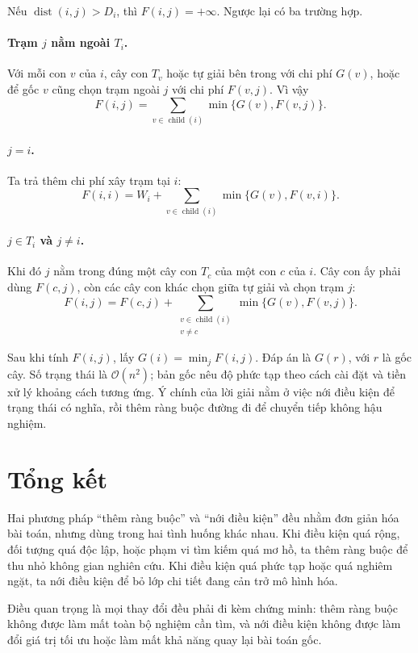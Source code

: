 \documentclass[11pt]{article}
\newcommand{\Oh}{\mathcal{O}}
\begin{document}
Nếu \(\operatorname{dist}(i,j)>D_i\), thì \(F(i,j)=+\infty\). Ngược lại có ba
trường hợp.

\paragraph{Trạm \(j\) nằm ngoài \(T_i\).}
Với mỗi con \(v\) của \(i\), cây con \(T_v\) hoặc tự giải bên trong với chi
phí \(G(v)\), hoặc để gốc \(v\) cũng chọn trạm ngoài \(j\) với chi phí
\(F(v,j)\). Vì vậy
\[
  F(i,j)=\sum_{v\in\operatorname{child}(i)}\min\{G(v),F(v,j)\}.
\]

\paragraph{\(j=i\).}
Ta trả thêm chi phí xây trạm tại \(i\):
\[
  F(i,i)=W_i+
  \sum_{v\in\operatorname{child}(i)}\min\{G(v),F(v,i)\}.
\]

\paragraph{\(j\in T_i\) và \(j\ne i\).}
Khi đó \(j\) nằm trong đúng một cây con \(T_c\) của một con \(c\) của \(i\).
Cây con ấy phải dùng \(F(c,j)\), còn các cây con khác chọn giữa tự giải và
chọn trạm \(j\):
\[
  F(i,j)=F(c,j)+
  \sum_{\substack{v\in\operatorname{child}(i)\\v\ne c}}
  \min\{G(v),F(v,j)\}.
\]

Sau khi tính \(F(i,j)\), lấy \(G(i)=\min_jF(i,j)\). Đáp án là \(G(r)\), với
\(r\) là gốc cây. Số trạng thái là \(\Oh(n^2)\); bản gốc nêu độ phức tạp theo
cách cài đặt và tiền xử lý khoảng cách tương ứng. Ý chính của lời giải nằm ở
việc nới điều kiện để trạng thái có nghĩa, rồi thêm ràng buộc đường đi để
chuyển tiếp không hậu nghiệm.

\section{Tổng kết}

Hai phương pháp ``thêm ràng buộc'' và ``nới điều kiện'' đều nhằm đơn giản hóa
bài toán, nhưng dùng trong hai tình huống khác nhau. Khi điều kiện quá rộng,
đối tượng quá độc lập, hoặc phạm vi tìm kiếm quá mơ hồ, ta thêm ràng buộc để
thu nhỏ không gian nghiên cứu. Khi điều kiện quá phức tạp hoặc quá nghiêm
ngặt, ta nới điều kiện để bỏ lớp chi tiết đang cản trở mô hình hóa.

Điều quan trọng là mọi thay đổi đều phải đi kèm chứng minh: thêm ràng buộc
không được làm mất toàn bộ nghiệm cần tìm, và nới điều kiện không được làm đổi
giá trị tối ưu hoặc làm mất khả năng quay lại bài toán gốc.
\end{document}
